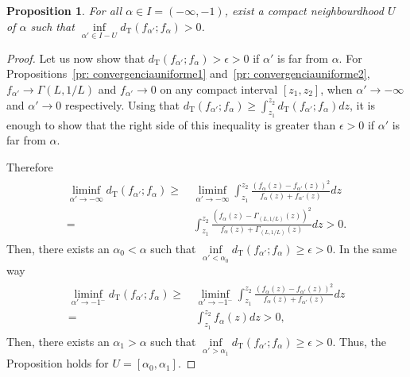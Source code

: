 \documentclass[technote,onecolumn,draftcls,12pt]{IEEEtran}
\newtheorem{proposition}{Proposition}
\numberwithin{equation}{section}
\newenvironment{dem}[1][Proof]{\begin{proof}[{\it #1}]}{\end{proof}}
\newcommand{\al}{&\,}
\newcommand{\pa}[1]{\ensuremath{\left( #1 \right)}}
\begin{document}
\begin{proposition}
	\label{pr: falpha>0}
	For all $\alpha\in I=(-\infty,-1)$, exist a compact neighbourdhood $U$ of $\alpha$ such that
	$\inf\limits_{\alpha'\in I-U}d_{\text{T}}({f_{\alpha'};f_{\alpha}})>0$.
\end{proposition}
\begin{dem}
	Let us now show that $d_{\text{T}}({f_{\alpha'};f_{\alpha}})>\epsilon>0$ if $\alpha'$ is far from $\alpha$. For Propositions~\ref{pr: convergenciauniforme1} and~\ref{pr: convergenciauniforme2}, $f_{\alpha'} \to \Gamma(L,1/L)$ and $f_{\alpha'} \to 0$ on any compact interval $[z_1,z_2]$, when $\alpha' \to -\infty$ and $\alpha' \to 0$ respectively.
	Using that $d_{\text{T}}\pa{f_{\alpha'};f_{\alpha}} \ge \int_{z_{1}}^{z_{2}}d_{\text{T}}\pa{f_{\alpha'};f_{\alpha}}dz$, it is enough to show that the right side of this inequality is greater than $\epsilon>0$ if $\alpha'$ is far from $\alpha$.
	
	Therefore
	\begin{align*}
	\begin{split}
	\liminf_{\alpha'\to-\infty} d_{\text{T}}\pa{f_{\alpha'};f_{\alpha}} 
	\ge \al \liminf_{\alpha'\to-\infty}\int_{z_{1}}^{z_{2}}\frac{\pa{f_{\alpha}\pa{z}-f_{\alpha'}\pa{z}}^{2}}
	{f_{\alpha}\pa{z}+f_{\alpha'}\pa{z}}dz \\
	= \al \int_{z_{1}}^{z_{2}}\frac{\pa{f_{\alpha}\pa{z}-\Gamma_{(L,1/L)}\pa{z}}^{2}}
	{f_{\alpha}\pa{z}+\Gamma_{(L,1/L)}\pa{z}}dz >0.
	\end{split}
	\end{align*}
	Then, there exists an $\alpha_0 < \alpha$ such that $\inf\limits_{\alpha'<\alpha_0} d_{\text{T}}\pa{f_{\alpha'};f_{\alpha}} \ge \epsilon>0.$ 
	In the same way
	\begin{align*}
	\begin{split}
	\liminf_{\alpha'\to-1^{-}} d_{\text{T}}\pa{f_{\alpha'};f_{\alpha}} 
	\ge \al \liminf_{\alpha'\to-1^{-}}\int_{z_{1}}^{z_{2}}\frac{\pa{f_{\alpha}\pa{z}-f_{\alpha'}\pa{z}}^{2}}
	{f_{\alpha}\pa{z}+f_{\alpha'}\pa{z}}dz \\
	= \al \int_{z_{1}}^{z_{2}}f_{\alpha}\pa{z}dz >0,
	\end{split}
	\end{align*}
	Then, there exists an $\alpha_1>\alpha$ such that $\inf\limits_{\alpha'>\alpha_1} d_{\text{T}}\pa{f_{\alpha'};f_{\alpha}} \ge \epsilon>0.$ 
	Thus, the Proposition holds for $U=[\alpha_0,\alpha_1].$
\end{dem}
\end{document}
